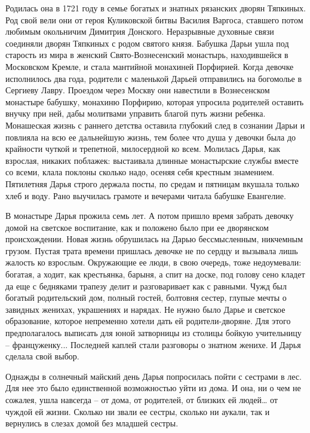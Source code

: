 Родилась она в 1721 году в семье богатых и знатных рязанских дворян Тяпкиных.
Род свой вели они от героя Куликовской битвы Василия Варгоса, ставшего потом
любимым окольничим Димитрия Донского. Неразрывные духовные связи соединяли
дворян Тяпкиных с родом святого князя. Бабушка Дарьи ушла под старость из мира
в женский Свято-Вознесенский монастырь, находившейся в Московском Кремле, и
стала мантийной монахиней Порфирией. Когда девочке исполнилось два года,
родители с маленькой Дарьей отправились на богомолье в Сергиеву Лавру. Проездом
через Москву они навестили в Вознесенском монастыре бабушку, монахиню Порфирию,
которая упросила родителей оставить внучку при ней, дабы молитвами управить
благой путь жизни ребенка. Монашеская жизнь с раннего детства оставила глубокий
след в сознании Дарьи и повлияла на всю ее дальнейшую жизнь, тем более что душа
у девочки была до крайности чуткой и трепетной, милосердной ко всем. Молилась
Дарья, как взрослая, никаких поблажек: выстаивала длинные монастырские службы
вместе со всеми, клала поклоны сколько надо, осеняя себя крестным знамением.
Пятилетняя Дарья строго держала посты, по средам и пятницам вкушала только хлеб
и воду. Рано выучилась грамоте и вечерами читала бабушке Евангелие.

В монастыре Дарья прожила семь лет. А потом пришло время забрать девочку домой
на светское воспитание, как и положено было при ее дворянском происхождении.
Новая жизнь обрушилась на Дарью бессмысленным, никчемным грузом. Пустая трата
времени пришлась девочке не по сердцу и вызывала лишь жалость ко взрослым.
Окружающие ее люди, в свою очередь, тоже недоумевали: богатая, а ходит, как
крестьянка, барыня, а спит на доске, под голову сено кладет да еще с бедняками
трапезу делит и разговаривает как с равными. Чужд был богатый родительский дом,
полный гостей, болтовня сестер, глупые мечты о завидных женихах, украшениях и
нарядах. Не нужно было Дарье и светское образование, которое непременно хотели
дать ей родители-дворяне. Для этого предполагалось выписать для юной затворницы
из столицы бойкую учительницу – француженку... Последней каплей стали разговоры
о знатном женихе. И Дарья сделала свой выбор.

Однажды в солнечный майский день Дарья попросилась пойти с сестрами в лес. Для
нее это было единственной возможностью уйти из дома. И она, ни о чем не
сожалея, ушла навсегда – от дома, от родителей, от близких ей людей… от чуждой
ей жизни. Сколько ни звали ее сестры, сколько ни аукали, так и вернулись в
слезах домой без младшей сестры.

